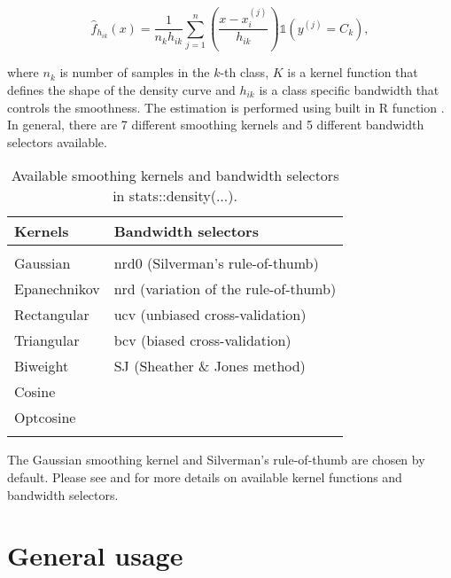 \documentclass{article}\usepackage[]{graphicx}\usepackage[]{color}
\begin{document}
$$\hat{f}_{h_{ik}}(x) = \frac{1}{n_{k}h_{ik}}\sum_{j=1}^n\left(\frac{x - x_i^{(j)}}{h_{ik}}\right)\mathbb{1}(y^{(j)} = C_k),$$

where $n_k$ is number of samples in the $k$-th class, $K$ is a kernel function that defines the shape of the density curve and $h_{ik}$ is a class specific bandwidth that controls the smoothness. The estimation is performed using built in R function \textcolor{darkgreen}{{}}.  In general, there are 7 different smoothing kernels and 5 different bandwidth selectors available.

\begin{table}[!htbp] \centering
\caption{Available smoothing kernels and bandwidth selectors in stats::density(...).}
\begin{tabular}{ll}
\hline %
\textbf{Kernels} & \textbf{Bandwidth selectors}         \\ \hline \\[-1.8ex]
Gaussian                               & nrd0 (Silverman's rule-of-thumb)                  \\
Epanechnikov                           & nrd (variation of the rule-of-thumb)              \\
Rectangular                            & ucv (unbiased cross-validation)                   \\
Triangular                             & bcv (biased cross-validation)                     \\
Biweight                               & SJ (Sheather \& Jones method)                     \\
Cosine                                 &                                                   \\
Optcosine                              &                                                   \\
\hline \\[-1.8ex]
\end{tabular}%
\end{table}

The Gaussian smoothing kernel and Silverman's rule-of-thumb are chosen by default. Please see \textcolor{darkgreen}{{}} and \textcolor{darkgreen}{{}} for more details on available kernel functions and bandwidth selectors.

\section{General usage}
\end{document}
